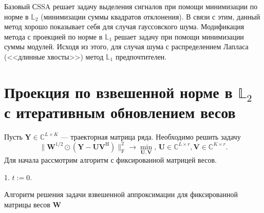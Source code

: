 \documentclass[specialist,
               substylefile = spbu.rtx,
               subf,href,colorlinks=true, 12pt]{disser}
\begin{document}
Базовый СSSA решает задачу выделения сигналов при помощи минимизации по норме в $\mathbb{L}_2$ (минимизации суммы квадратов отклонения). В связи с этим, данный метод хорошо показывает себя для случая гауссовского шума. Модификация метода с проекцией по норме в $\mathbb{L}_1$ решает задачу при помощи минимизации суммы модулей. Исходя из этого, для случая шума с распределением Лапласа (<<длинные хвосты>>) метод $\mathbb{L}_1$ предпочтителен.

\section{Проекция по взвешенной норме в $\mathbb{L}_2$ с итеративным обновлением весов}

Пусть $\mathbf{Y} \in \mathbb{C}^{L\times K}$ --- траекторная матрица ряда.
Необходимо решить задачу
\begin{equation*}
		\|\mathbf{W}^{1/2}\odot(\mathbf{Y}-\mathbf{U}\mathbf{V}^{\mathrm{H}})\|^2_\mathrm{F} \longrightarrow \min_{\mathbf{U},\mathbf{V}}, \, \mathbf{U} \in \mathbb{C}^{L\times r}, \mathbf{V} \in \mathbb{C}^{K\times r}.
\end{equation*}
Для начала рассмотрим алгоритм с фиксированной матрицей весов.

\begin{algorithm}[H]\label{alg}
	\SetAlgoLined
	
	1. $t:=0$. 
	\caption{Алгоритм решения задачи взвешенной аппроксимации для фиксированной матрицы весов $\mathbf{W}$}
\end{algorithm}
\end{document}
